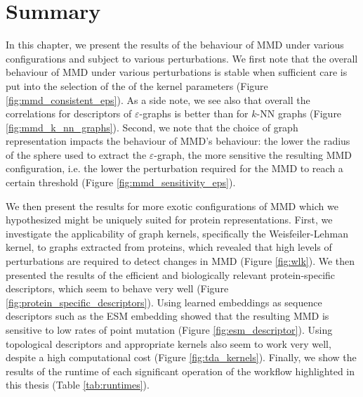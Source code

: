 \section{Summary}

In this chapter, we present the results of the behaviour of MMD under various
configurations and subject to various perturbations. We first note that the
overall behaviour of MMD under various perturbations is stable when sufficient
care is put into the selection of the of the kernel parameters (Figure \ref{fig:mmd_consistent_eps}). As a side note,
we see also that overall the correlations for descriptors of
$\varepsilon$-graphs is better than for $k$-NN graphs (Figure \ref{fig:mmd_k_nn_graphs}). Second, we note that the
choice of graph representation impacts the behaviour of MMD's behaviour: the
lower the radius of the sphere used to extract the $\varepsilon$-graph, the more
sensitive the resulting MMD configuration, i.e. the lower the perturbation
required for the MMD to reach a certain threshold (Figure
\ref{fig:mmd_sensitivity_eps}).

We then present the results for more exotic configurations of MMD which we
hypothesized might be uniquely suited for protein representations. First, we
investigate the applicability of graph kernels, specifically the
Weisfeiler-Lehman kernel, to graphs extracted from proteins, which revealed that
high levels of perturbations are required to detect changes in MMD (Figure
\ref{fig:wlk}). We then presented the results of the efficient and biologically
relevant protein-specific descriptors, which seem to behave very well (Figure
\ref{fig:protein_specific_descriptors}). Using learned embeddings as sequence
descriptors such as the ESM embedding showed that the resulting MMD is sensitive
to low rates of point mutation (Figure \ref{fig:esm_descriptor}). Using
topological descriptors and appropriate kernels also seem to work very well, despite
a high computational cost (Figure \ref{fig:tda_kernels}). Finally, we show the
results of the runtime of each significant operation of the workflow highlighted
in this thesis (Table \ref{tab:runtimes}).
